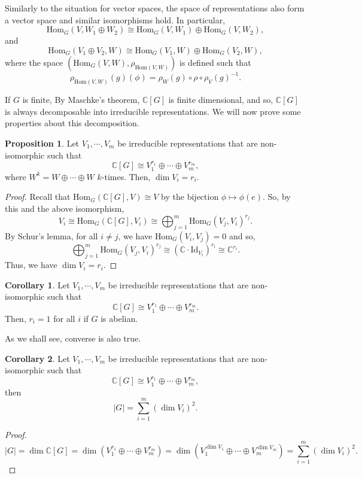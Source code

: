 \documentclass[]{article}
\theoremstyle{definition}
\newtheorem{corollary}{Corollary}[theorem]
\theoremstyle{definition}
\newtheorem{proposition}{Proposition}[section]
\begin{document}
Similarly to the situation for vector spaces, the space of representations also 
form a vector space and similar isomorphisms hold. In particular, 
\[\text{Hom}_G(V, W_1 \oplus W_2) \cong \text{Hom}_G(V, W_1) \oplus \text{Hom}_G(V, W_2),\]
and
\[\text{Hom}_G(V_1 \oplus V_2, W) \cong \text{Hom}_G(V_1, W) \oplus \text{Hom}_G(V_2, W),\]
where the space \((\text{Hom}_G(V, W), \rho_{\text{Hom}(V, W)})\) is defined such 
that 
\[\rho_{\text{Hom}(V, W)}(g)(\phi) = \rho_W(g) \circ \rho \circ \rho_V(g)^{-1}.\]

If \(G\) is finite, By Maschke's theorem, \(\mathbb{C}[G]\) is finite dimensional, 
and so, \(\mathbb{C}[G]\) is always decomposable into irreducible representations. 
We will now prove some properties about this decomposition.

\begin{proposition}
  Let \(V_1, \cdots, V_m\) be irreducible representations that are 
  non-isomorphic such that 
  \[\mathbb{C}[G] \cong V_1^{r_1} \oplus \cdots \oplus V_m^{r_m},\]
  where \(W^k = W \oplus \cdots \oplus W\) \(k\)-times. Then, \(\dim V_i = r_i\).
\end{proposition}
\begin{proof}
  Recall that \(\text{Hom}_G(\mathbb{C}[G], V) \cong V\) by the bijection 
  \(\phi \mapsto \phi(e)\). So, by this and the above isomorphism,
  \[V_i \cong \text{Hom}_G(\mathbb{C}[G], V_i) \cong 
    \bigoplus_{j = 1}^m \text{Hom}_G(V_j, V_i)^{r_j}.\]
  By Schur's lemma, for all \(i \neq j\), we have \(\text{Hom}_G(V_i, V_j) = 0\) 
  and so,
  \[\bigoplus_{j = 1}^m \text{Hom}_G(V_j, V_i)^{r_j} \cong 
    (\mathbb{C} \cdot \text{Id}_{V_i})^{r_i} \cong \mathbb{C}^{r_i}.\]
  Thus, we have \(\dim V_i = r_i\).
\end{proof}

\begin{corollary}
  Let \(V_1, \cdots, V_m\) be irreducible representations that are 
  non-isomorphic such that 
  \[\mathbb{C}[G] \cong V_1^{r_1} \oplus \cdots \oplus V_m^{r_m}.\]
  Then, \(r_i = 1\) for all \(i\) if \(G\) is abelian.
\end{corollary}

As we shall see, converse is also true.

\begin{corollary}
  Let \(V_1, \cdots, V_m\) be irreducible representations that are 
  non-isomorphic such that 
  \[\mathbb{C}[G] \cong V_1^{r_1} \oplus \cdots \oplus V_m^{r_m},\]
  then 
  \[|G| = \sum_{i = 1}^m (\dim V_i)^2.\]
\end{corollary}
\begin{proof}
  \[|G| = \dim \mathbb{C}[G] = \dim (V_1^{r_1} \oplus \cdots \oplus V_m^{r_m}) 
    = \dim (V_1^{\dim V_1} \oplus \cdots \oplus V_m^{\dim V_m}) 
    = \sum_{i = 1}^m (\dim V_i)^2.\]
\end{proof}
\end{document}
